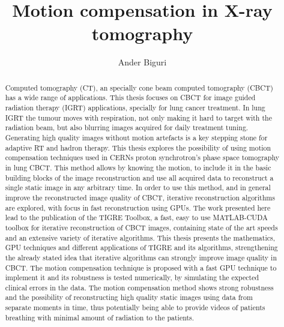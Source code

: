 \documentclass[11pt]{report}
\title{Motion compensation in X-ray tomography}
\author{Ander Biguri}
\begin{document}
\maketitle





\tableofcontents
\listoffigures
\listoftables

\begin{abstract}
Computed tomography (CT), an specially cone beam computed tomography (CBCT) has a wide  range of applications. This thesis focuses on CBCT for image guided radiation therapy (IGRT) applications, specially for lung cancer treatment. In lung IGRT the tumour moves with respiration, not only making it hard to target with the radiation beam, but also blurring images acquired for daily treatment tuning. Generating high quality images without motion artefacts is a key stepping stone for adaptive RT and hadron therapy. This thesis explores the possibility of using motion compensation techniques used in CERNs proton synchrotron's phase space tomography in lung CBCT. This method allows by knowing the motion, to include it in the basic building blocks of the image reconstruction and use all acquired data to reconstruct a single static image in any arbitrary time. In order to use this method, and in general improve the reconstructed image quality of CBCT, iterative reconstruction algorithms are explored, with focus in fast reconstruction using GPUs. The work presented here lead to the publication of the TIGRE Toolbox, a fast, easy to use MATLAB-CUDA toolbox for iterative reconstruction of CBCT images, containing state of the art speeds and an extensive variety of iterative algorithms. This thesis presents the mathematics, GPU techniques and different applications of TIGRE and its algorithms, strengthening the already stated idea that iterative algorithms can strongly improve image quality in CBCT. The motion compensation technique is proposed with a fast GPU technique to implement it and its robustness is tested numerically, by simulating the expected clinical errors in the data. The motion compensation method shows strong robustness and the possibility of reconstructing high quality static images using data from separate moments in time, thus potentially being able to provide videos of patients breathing with minimal amount of radiation to the patients. 

\end{abstract}
\end{document}

